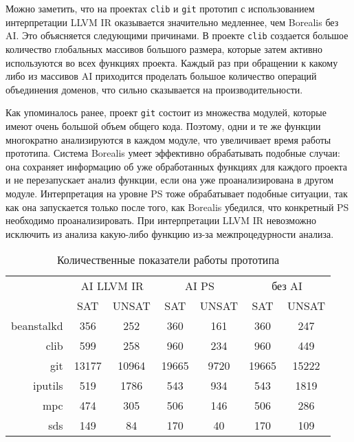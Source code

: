 Можно заметить, что на проектах \texttt{clib} и \texttt{git} прототип с 
использованием интерпретации LLVM IR оказывается значительно медленнее, чем
Borealis без AI. Это объясняется следующими причинами. В проекте \texttt{clib}
создается большое количество глобальных массивов большого размера, которые
затем активно используются во всех функциях проекта. Каждый раз при обращении
к какому либо из массивов AI приходится проделать большое количество операций
объединения доменов, что сильно сказывается на производительности.

Как упоминалось ранее, проект \texttt{git} состоит из множества модулей, 
которые имеют очень большой объем общего кода. Поэтому, одни и те же функции
многократно анализируются в каждом модуле, что увеличивает время работы 
прототипа. Система Borealis умеет эффективно обрабатывать подобные случаи: она
сохраняет информацию об уже обработанных функциях для каждого проекта и не 
перезапускает анализ функции, если она уже проанализирована в другом модуле. 
Интерпретация на уровне PS тоже обрабатывает подобные ситуации, так как она
запускается только после того, как Borealis убедился, что конкретный PS 
необходимо проанализировать. При интерпретации LLVM IR невозможно исключить
из анализа какую-либо функцию из-за межпроцедурности анализа.

\begin{table}
\captionsetup{skip=5pt}
\caption{Количественные показатели работы прототипа}
\centering
\begin{tabular}{|r|c|c|c|c|c|c|}
\hline
            \multirow{2}{*}{}
           & \multicolumn{2}{c|}{AI LLVM IR} 
           & \multicolumn{2}{c|}{AI PS} 
           & \multicolumn{2}{c|}{без AI} \\ \cline{2-7}
           & SAT    & UNSAT   & SAT    & UNSAT   & SAT    & UNSAT   \\ \hline
beanstalkd & 356    & 252     & 360    & 161     & 360    & 247     \\ \hline
clib       & 599    & 258     & 960    & 234     & 960    & 449     \\ \hline
git        & 13177  & 10964   & 19665  & 9720    & 19665  & 15222   \\ \hline
iputils    & 519    & 1786    & 543    & 934     & 543    & 1819    \\ \hline
mpc        & 474    & 305     & 506    & 146     & 506    & 286     \\ \hline
sds        & 149    & 84      & 170    & 40      & 170    & 109     \\ \hline
\end{tabular}
\label{table:checkResults}
\end{table}

